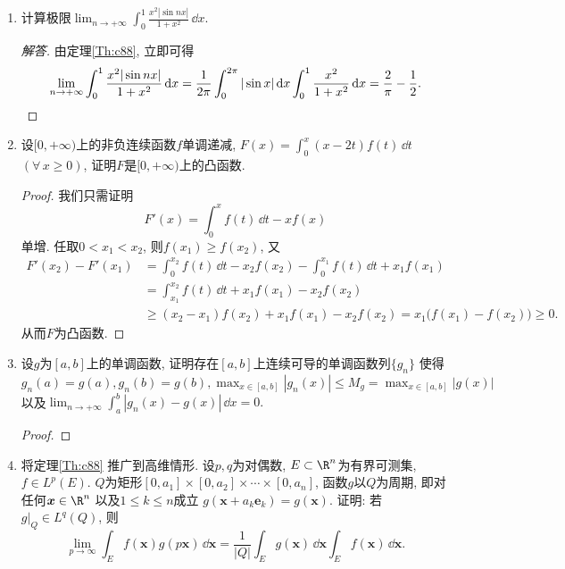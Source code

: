 \begin{quiza}
\begin{enumerate}
\item 计算极限\(\lim_{n\rightarrow +\infty}\int_{0}^{1}\frac{x^2|\sin nx|}{1+x^2}\,\dd x.\)
\begin{proof}[解答]
由定理\ref{Th:c88}, 立即可得
\[\lim_{n\rightarrow +\infty}\int_{0}^{1}\frac{x^2|\sin nx|}{1+x^2}\,\mathrm{d} x
=\frac{1}{2\pi}\int_{0}^{2\pi}|\sin x|\,\mathrm{d} x\int_{0}^{1}\frac{x^2}{1+x^2}\,\mathrm{d} x
=\frac{2}{\pi}-\frac{1}{2}.\qedhere\]
\end{proof}

\item 设\([0,+\infty)\)上的非负连续函数\(f\)单调递减, 
\(F(x)=\int_{0}^{x}(x-2t)f(t)\,\dd t\) \((\forall\, x\geqslant 0)\), 
证明\(F\)是\([0,+\infty)\)上的凸函数.
\begin{proof}
我们只需证明\[F'(x)=\int_{0}^{x}f(t)\,\dd t-xf(x)\]单增. 
任取\(0<x_1<x_2\), 则\(f(x_1)\geqslant f(x_2)\), 又\[\begin{split}
F'(x_2)-F'(x_1)&=\int_{0}^{x_2}f(t)\,\dd t-x_2f(x_2)-\int_{0}^{x_1}f(t)\,\dd t+x_1f(x_1)\\
&=\int_{x_1}^{x_2}f(t)\,\dd t+x_1f(x_1)-x_2f(x_2)\\
&\geqslant (x_2-x_1)f(x_2)+x_1f(x_1)-x_2f(x_2)
=x_1\big(f(x_1)-f(x_2)\big)\geqslant 0.
\end{split}\]从而\(F\)为凸函数.
\end{proof}

\item 设\(g\)为\([a,b]\)上的单调函数, 证明存在\([a,b]\)上连续可导的单调函数列\(\{g_n\}\)
使得\(g_n(a)=g(a),g_n(b)=g(b),\max_{x\in [a,b]}|g_n(x)|\leqslant M_g=\max_{x\in [a,b]}|g(x)|\)
以及\(\lim_{n\rightarrow+\infty}\int_{a}^{b}|g_n(x)-g(x)|\,\dd x=0.\)
\begin{proof}

\end{proof}
\item 将定理\ref{Th:c88} 推广到高维情形. 
设\(p,q\)为对偶数, \(E\subset\R^n\)为有界可测集, \(f\in L^p(E)\). 
\(Q\)为矩形\([0,a_1]\times [0,a_2]\times\cdots\times [0,a_n]\), 
函数\(g\)以\(Q\)为周期, 即对任何\(\boldsymbol{x}\in \R^n\)
以及\(1\leqslant k\leqslant n\)成立
\(g(\boldsymbol{x}+a_k\boldsymbol{e}_k)=g(\boldsymbol{x})\). 
证明: 若\(g\big|_Q\in L^q(Q)\), 则
\[\lim_{p\rightarrow\infty}\int_Ef(\boldsymbol{x})g(p\boldsymbol{x})\,\dd\boldsymbol{x}
=\frac{1}{|Q|}\int_Eg(\boldsymbol{x})\,\dd\boldsymbol{x}\int_Ef(\boldsymbol{x})\,\dd\boldsymbol{x}.\]


\end{enumerate}
\end{quiza}
